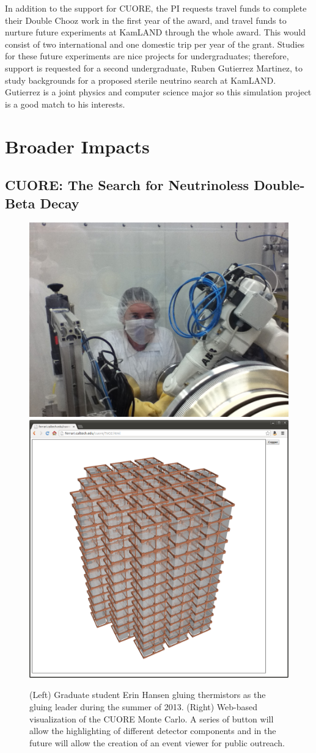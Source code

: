 In addition to the support for CUORE, the PI requests travel funds to complete their Double Chooz work in the first year of the award, and travel funds to nurture future experiments at KamLAND through the whole award. This would consist of two international and one domestic trip per year of the grant. Studies for these future experiments are nice projects for undergraduates; therefore, support is requested for a second undergraduate, Ruben Gutierrez Martinez, to study backgrounds for a proposed sterile neutrino search at KamLAND\cite{isodar}. Gutierrez is a joint physics and computer science major so this simulation project is a good match to his interests.

\section{Broader Impacts}
\subsection{CUORE:  The Search for Neutrinoless Double-Beta Decay}
\begin{figure}
\begin{center}
\includegraphics[width=0.35\columnwidth]{figs/Erin1.jpg} 
\includegraphics[width=0.3\columnwidth]{figs/viewerPlain.png} 
\end{center}
\caption{\label{broad} (Left) Graduate student Erin Hansen gluing thermistors as the gluing leader during the summer of 2013. (Right) Web-based visualization of the CUORE Monte Carlo. A series of button will allow the highlighting of different detector components and in the future will allow the creation of an event viewer for public outreach. }
\end{figure}

